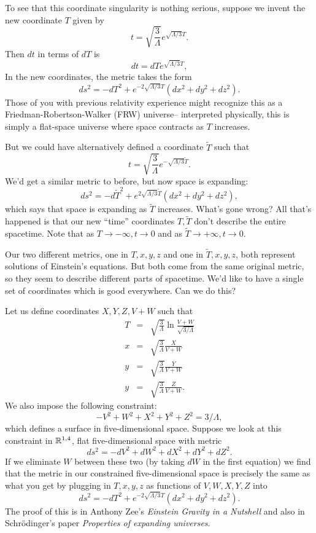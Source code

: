 To see that this coordinate singularity is nothing serious, suppose we invent the new coordinate $T$ given by
$$t=\sqrt{\frac{3}{\Lambda}} e^{\sqrt{\Lambda/3} T}.$$
Then $dt$ in terms of $dT$ is
$$dt=dT e^{\sqrt{\Lambda/3}T},$$
In the new coordinates, the metric takes the form
$$ds^2 = -dT^2 + e^{-2\sqrt{\Lambda/3}T}(dx^2+dy^2+dz^2).$$
Those of you with previous relativity experience might recognize this as a Friedman-Robertson-Walker (FRW) universe-- interpreted physically, this is simply a flat-space universe where space contracts as $T$ increases.

But we could have alternatively defined a coordinate $\tilde T$ such that
$$t=\sqrt{\frac{3}{\Lambda}}e^{-\sqrt{\Lambda/3}\tilde T}.$$
We'd get a similar metric to before, but now space is expanding:
$$ds^2 = -d\tilde T^2 +e^{2\sqrt{\Lambda/3}\tilde T} (dx^2+dy^2 + dz^2),$$
which says that space is expanding as $\tilde T$ increases. What's gone wrong? All that's happened is that our new ``time'' coordinates $T,\tilde T$ don't describe the entire spacetime. Note that as $T\to -\infty, t\to 0$ and as $\tilde T \to +\infty, t\to 0$.

Our two different metrics, one in $T,x,y,z$ and one in $\tilde T,x,y,z$, both represent solutions of Einstein's equations. But both come from the same original metric, so they seem to describe different parts of spacetime. We'd like to have a single set of coordinates which is good everywhere. Can we do this?

Let us define coordinates $X,Y,Z,V+W$ such that
\begin{eqnarray*}
T&=&\sqrt{\frac{3}{\Lambda}}\ln \frac{V+W}{\sqrt{3/\Lambda}}\\
x&=& \sqrt{\frac{3}{\Lambda}} \frac{X}{V+W}\\
y&=& \sqrt{\frac{3}{\Lambda}} \frac{Y}{V+W}\\
y&=& \sqrt{\frac{3}{\Lambda}} \frac{Z}{V+W}.
\end{eqnarray*}
We also impose the following constraint:
$$-V^2+W^2+X^2+Y^2 +Z^2=3/\Lambda,$$
which defines a surface in five-dimensional space. Suppose we look at this constraint in $\mathbb{R}^{1,4}$, flat five-dimensional space with metric
$$ds^2=-dV^2+dW^2+dX^2+dY^2+dZ^2.$$
If we eliminate $W$ between these two (by taking $dW$ in the first equation) we find that the metric in our constrained five-dimensional space is precisely the same as what you get by plugging in
$T,x,y,z$ as functions of $V,W,X,Y,Z$ into
$$ds^2=-dT^2+e^{-2\sqrt{\Lambda/3}T}(dx^2+dy^2+dz^2).$$
The proof of this is in Anthony Zee's \textit{Einstein Gravity in a Nutshell} and also in Schr\"odinger's paper \textit{Properties of expanding universes}.